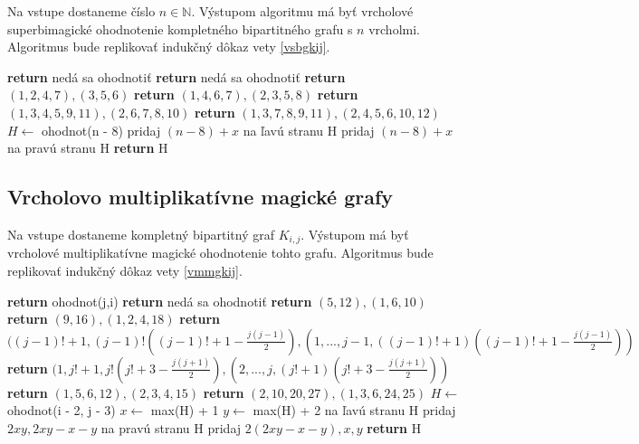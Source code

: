 \begin{subalg}  Na vstupe dostaneme číslo $n \in \mathbb{N}$. Výstupom algoritmu má byť vrcholové superbimagické ohodnotenie kompletného bipartitného grafu s $n$ vrcholmi. Algoritmus bude replikovať indukčný dôkaz vety \ref{vsbgkij}.
\end{subalg}

\begin{algorithmic}
	\STATE \textbf{return} nedá sa ohodnotiť
\ENDIF
{}
	\STATE \textbf{return} nedá sa ohodnotiť
\ENDIF
{}
	\STATE \textbf{return} $(1, 2, 4, 7), (3, 5, 6)$
\ENDIF
{}
	\STATE \textbf{return} $(1, 4, 6, 7), (2, 3, 5, 8)$
\ENDIF
{}
	\STATE \textbf{return} $(1, 3, 4, 5, 9, 11), (2, 6, 7, 8, 10)$
\ENDIF
{}
	\STATE \textbf{return} $(1, 3, 7, 8, 9, 11), (2, 4, 5, 6, 10, 12)$
\ENDIF
\STATE $H \gets$ ohodnot(n - 8)
		\STATE pridaj $(n-8)+x$ na ľavú stranu H
	\ELSE
		\STATE pridaj $(n-8)+x$ na pravú stranu H
	\ENDIF
\ENDFOR
\STATE \textbf{return} H
\end{algorithmic}

\subsection{Vrcholovo multiplikatívne magické grafy}

\begin{subalg} Na vstupe dostaneme kompletný bipartitný graf $K_{i,j}$. Výstupom má byť vrcholové multiplikatívne magické ohodnotenie tohto grafu. Algoritmus bude replikovať indukčný dôkaz vety \ref{vmmgkij}.
\end{subalg}

\begin{algorithmic}
	\STATE \textbf{return} ohodnot(j,i)
\ENDIF
{}
	\STATE \textbf{return} nedá sa ohodnotiť
\ENDIF
{}
	\STATE \textbf{return} $(5, 12), (1, 6, 10)$
\ENDIF
{}
	\STATE \textbf{return} $(9, 16), (1, 2, 4, 18)$
\ENDIF
{}
	\STATE \textbf{return} $((j-1)! + 1, (j-1)! ((j-1)! + 1 - \frac{j(j-1)}{2}), (1, ... , j-1, ((j-1)! + 1) ((j-1)! + 1 - \frac{j(j-1)}{2}))$
\ENDIF
{}
	\STATE \textbf{return} $(1, j! + 1, j! (j! + 3 - \frac{j(j+1)}{2}), (2, ... , j, (j! + 1) (j! + 3 - \frac{j(j+1)}{2}))$
\ENDIF
{}
	\STATE \textbf{return} $(1, 5, 6, 12), (2, 3, 4, 15)$
\ENDIF
{}
	\STATE \textbf{return} $(2, 10, 20, 27), (1, 3, 6, 24, 25)$
\ENDIF
\STATE $H \gets$ ohodnot(i - 2, j - 3)
\STATE $x \gets$ max(H) + 1
\STATE $y \gets$ max(H) + 2
\STATE na ľavú stranu H pridaj $2xy, 2xy - x - y$
\STATE na pravú stranu H pridaj $2(2xy - x - y), x, y$
\STATE \textbf{return} H
\end{algorithmic}

